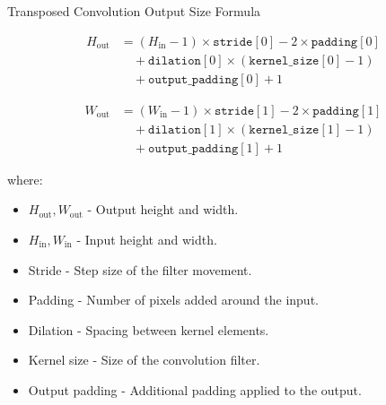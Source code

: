 \begin{frame}[allowframebreaks]{Transposed Convolution Output Size Formula}

\small
\begin{equation}
\begin{aligned}
H_{\text{out}} &= (H_{\text{in}} - 1) \times \texttt{stride}[0] - 2 \times \texttt{padding}[0] \\
&\quad + \texttt{dilation}[0] \times (\texttt{kernel\_size}[0] - 1) \\
&\quad + \texttt{output\_padding}[0] + 1
\end{aligned}
\end{equation}

\begin{equation}
\begin{aligned}
W_{\text{out}} &= (W_{\text{in}} - 1) \times \texttt{stride}[1] - 2 \times \texttt{padding}[1] \\
&\quad + \texttt{dilation}[1] \times (\texttt{kernel\_size}[1] - 1) \\
&\quad + \texttt{output\_padding}[1] + 1
\end{aligned}
\end{equation}

\vspace{1em}
where:
\begin{itemize}
    \item \( H_{\text{out}}, W_{\text{out}} \) - Output height and width.
    \item \( H_{\text{in}}, W_{\text{in}} \) - Input height and width.
    \item Stride - Step size of the filter movement.
    \item Padding - Number of pixels added around the input.
    \item Dilation - Spacing between kernel elements.
    \item Kernel size - Size of the convolution filter.
    \item Output padding - Additional padding applied to the output.
\end{itemize}
\end{frame}
